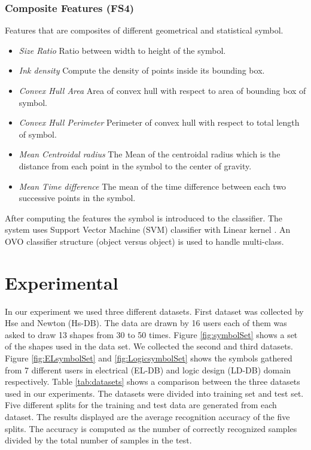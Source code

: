\documentclass{article}
\begin{document}
\subsubsection{Composite Features (FS4)}
 Features that are composites of different geometrical and statistical symbol. 
	\begin{itemize}
\item \emph{Size Ratio} Ratio between width to height of the symbol.
	\item \emph{Ink density} Compute the density of points inside its bounding box\cite{GeometryAndDomain102}.   
 	\item \emph{Convex Hull Area} Area of convex hull with respect to area of bounding box of symbol.
	\item \emph{Convex Hull Perimeter} Perimeter of convex hull with respect to total length of symbol.
		\item \emph{Mean Centroidal radius} The Mean of the centroidal radius which is the distance from each point in the symbol to the center of gravity.
	
	\item \emph{Mean Time difference} The mean of the time difference between each two successive points in the symbol. %
  \end{itemize}
  
  
After computing the features the symbol is introduced to the classifier. The system uses Support Vector Machine (SVM) classifier with Linear kernel \cite{libsvm}. An OVO classifier structure (object versus object) is used to handle multi-class.%

\section{Experimental}
\label{sec:Experiments}
In our experiment we used three different datasets. First dataset was collected by Hse and Newton\cite{HeloiseBeautification} (Hs-DB). The data are drawn by 16 users each of them was asked to draw 13 shapes from 30 to 50 times. Figure \ref{fig:symbolSet} shows a set of the shapes used in the data set. We collected the second and third datasets. Figure \ref{fig:ELsymbolSet} and \ref{fig:LogicsymbolSet} shows the symbols gathered from 7 different users in electrical (EL-DB) and logic design (LD-DB) domain respectively.  Table \ref{tab:datasets} shows a  comparison between the three datasets used in our experiments. The datasets were divided into training set and test set. Five different splits  for the training and test data are generated from each dataset. The results displayed are the average recognition accuracy of the five splits. The accuracy is computed as the number of correctly recognized samples divided by the total number of samples in the test. 
\end{document}
